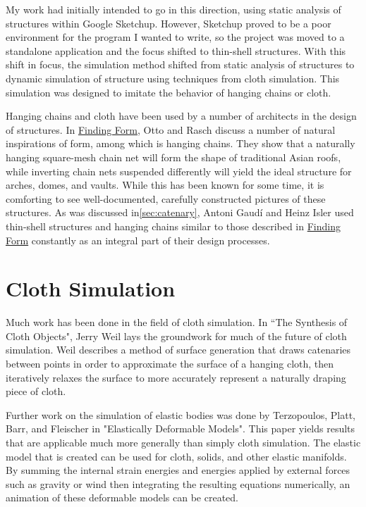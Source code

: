 \documentclass{thesis}
\begin{document}
My work had initially intended to go in this direction, using static analysis of structures within
Google Sketchup.  However, Sketchup proved to be a poor environment for the program I wanted to write, so
the project was moved to a standalone application and the focus shifted to thin-shell structures.  With this
shift in focus, the simulation method shifted from static analysis of structures to dynamic simulation of
structure using techniques from cloth simulation.  This simulation was designed to imitate the behavior of
hanging chains or cloth.

Hanging chains and cloth have been used by a number of architects in the design of structures.  In
\underline{Finding Form}\cite{otto95findingform}, Otto and Rasch discuss a number of natural inspirations of form, among which
is hanging chains.  They show that a naturally hanging square-mesh chain net will form the shape of
traditional Asian roofs, while inverting chain nets suspended differently will yield the ideal structure
for arches, domes, and vaults.  While this has been known for some time, it is comforting to see
well-documented, carefully constructed pictures of these structures.  As was discussed in\ref{sec:catenary},
Antoni Gaud\'{i} and Heinz Isler used thin-shell structures and hanging chains similar to those described in
\underline{Finding Form} constantly as an integral part of their design processes.

\section{Cloth Simulation}
Much work has been done in the field of cloth simulation.  In ``The Synthesis of Cloth
Objects"\cite{weil86synthcloth}, Jerry Weil lays the groundwork for much of the future of cloth simulation.
Weil describes a method of surface generation that draws catenaries between points in order to approximate
the surface of a hanging cloth, then iteratively relaxes the surface to more accurately represent a
naturally draping piece of cloth.

Further work on the simulation of elastic bodies was done by Terzopoulos, Platt, Barr, and Fleischer in
"Elastically Deformable Models"\cite{terzopoulos87elastic}.  This paper yields results that are applicable
much more generally than simply cloth simulation.  The elastic model that is created can be used for cloth,
solids, and other elastic manifolds.  By summing the internal strain energies and energies applied by
external forces such as gravity or wind then integrating the resulting equations numerically, an animation
of these deformable models can be created.
\end{document}
